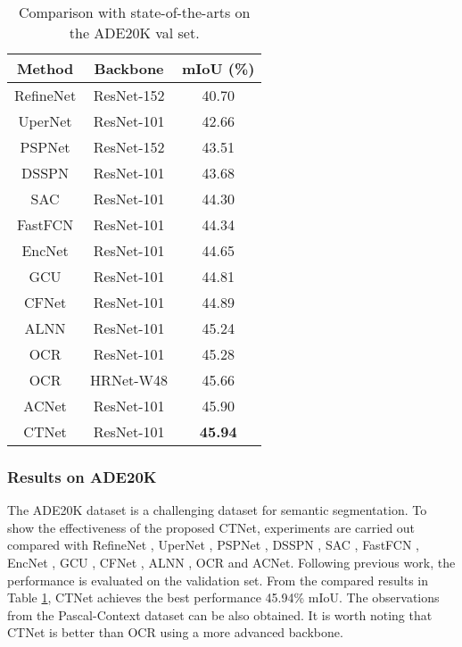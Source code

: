 \documentclass[10pt,journal,cspaper,compsoc]{IEEEtran}
\begin{document}
\begin{table}[t]
\caption{Comparison with state-of-the-arts on the ADE20K val set.}
		\label{table8}
		\renewcommand\arraystretch{1.3}
		\centering
		\begin{tabular}{c|c|c}
			\hline
			Method &Backbone  & mIoU (\%)\\
			\hline
			RefineNet \cite{lin2017refinenet}& ResNet-152& 40.70\\
			UperNet \cite{xiao2018unified}& ResNet-101& 42.66\\
			PSPNet \cite{zhao2017pyramid}& ResNet-152& 43.51\\
			DSSPN \cite{liang2018dynamic}& ResNet-101& 43.68\\
			SAC \cite{zhang2017scale}& ResNet-101& 44.30\\
			FastFCN \cite{wu2019fastfcn} & ResNet-101& 44.34\\
			EncNet \cite{zhang2018context} & ResNet-101& 44.65\\
			GCU \cite{li2018beyond}& ResNet-101& 44.81\\
			CFNet \cite{zhang2019co}& ResNet-101& 44.89\\
			ALNN  \cite{zhu2019asymmetric}&ResNet-101&45.24\\
			OCR \cite{yuan2020object}&ResNet-101&45.28\\
			OCR \cite{yuan2020object}&HRNet-W48&45.66\\
			ACNet\cite{fu2019adaptive}&ResNet-101&45.90\\
			\hline
			CTNet & ResNet-101& \textbf{45.94}\\
			\hline
	\end{tabular}
\end{table}
	
\subsubsection{Results on ADE20K}
The ADE20K dataset is a challenging dataset for semantic segmentation. To show the effectiveness of the proposed CTNet, experiments are carried out compared with RefineNet \cite{lin2017refinenet}, UperNet \cite{xiao2018unified}, PSPNet \cite{zhao2017pyramid}, DSSPN \cite{liang2018dynamic}, SAC \cite{zhang2017scale}, FastFCN \cite{wu2019fastfcn}, EncNet \cite{zhang2018context}, GCU \cite{li2018beyond}, CFNet \cite{zhang2019co}, ALNN \cite{zhu2019asymmetric}, OCR \cite{yuan2020object} and ACNet\cite{fu2019adaptive}. Following previous work, the performance is evaluated on the validation set. From the compared results in Table \ref{table8}, CTNet achieves the best performance 45.94\% mIoU. The observations from the Pascal-Context dataset can be also obtained. It is worth noting that CTNet is better than OCR \cite{yuan2020object} using a more advanced backbone.
\end{document}
